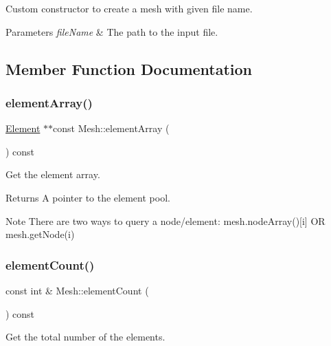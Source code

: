 Custom constructor to create a mesh with given file name. 


\begin{DoxyParams}{Parameters}
{\em file\+Name} & The path to the input file. \\
\hline
\end{DoxyParams}


\subsection{Member Function Documentation}
\mbox{\label{class_mesh_a042cc2ef19b7090f830b915721818181}} 
\subsubsection{\texorpdfstring{element\+Array()}{elementArray()}}
{\footnotesize\ttfamily \mbox{\hyperlink{class_element}{Element}} $\ast$$\ast$const Mesh\+::element\+Array (\begin{DoxyParamCaption}{ }\end{DoxyParamCaption}) const}



Get the element array. 

\begin{DoxyReturn}{Returns}
A pointer to the element pool.
\end{DoxyReturn}
\begin{DoxyNote}{Note}
There are two ways to query a node/element\+: mesh.\+node\+Array()\mbox{[}i\mbox{]} OR mesh.\+get\+Node(i) 
\end{DoxyNote}
\mbox{\label{class_mesh_aa1b2aafa40bd4b335e9bf6306e482881}} 
\subsubsection{\texorpdfstring{element\+Count()}{elementCount()}}
{\footnotesize\ttfamily const int \& Mesh\+::element\+Count (\begin{DoxyParamCaption}{ }\end{DoxyParamCaption}) const}



Get the total number of the elements. 

